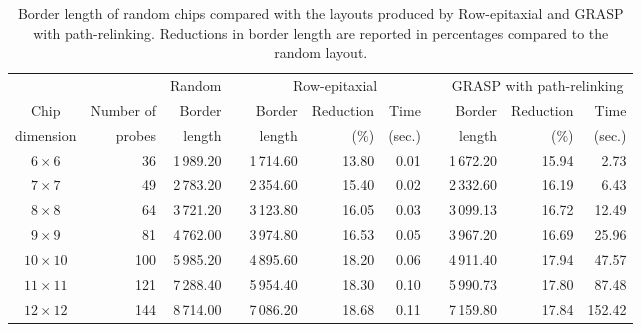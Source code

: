 \documentclass[english]{lni}
\newcommand{\ignore}[1]{}
\begin{document}
\ignore{
The main routine takes
three arguments: matrices $F$ and $D$ and the dimension of the problem~$n$ (in
our case, the number of spots or probes). We generated the matrices using the
formulations presented in Section \ref{sec:qap}.
}

\begin{table}[t]
\caption{Border length of random chips compared with the layouts produced by
Row-epitaxial and GRASP with path-relinking. Reductions in border length are
reported in percentages compared to the random layout.\label{tab:graspr_reptx}}
\vspace*{2ex}
\scriptsize{
\begin{tabular}{crrcrrrcrrr}
          &            & Random & & \multicolumn{3}{c}{Row-epitaxial}  & & \multicolumn{3}{c}{GRASP with path-relinking}  \\ \cline{3-3} \cline{5-7} \cline{9-11}
Chip      & Number of  & Border & & Border & Reduction & Time          & & Border & Reduction & Time   \\
dimension & probes     & length & & length & (\%)      & (sec.)        & & length & (\%)      & (sec.) \\
\hline
$6\times 6$   &  36 & 1\,989.20 & & 1\,714.60 & 13.80 & 0.01 & & 1\,672.20 & 15.94 &   2.73 \\
$7\times 7$   &  49 & 2\,783.20 & & 2\,354.60 & 15.40 & 0.02 & & 2\,332.60 & 16.19 &   6.43 \\
$8\times 8$   &  64 & 3\,721.20 & & 3\,123.80 & 16.05 & 0.03 & & 3\,099.13 & 16.72 &  12.49 \\
$9\times 9$   &  81 & 4\,762.00 & & 3\,974.80 & 16.53 & 0.05 & & 3\,967.20 & 16.69 &  25.96 \\
$10\times 10$ & 100 & 5\,985.20 & & 4\,895.60 & 18.20 & 0.06 & & 4\,911.40 & 17.94 &  47.57 \\
$11\times 11$ & 121 & 7\,288.40 & & 5\,954.40 & 18.30 & 0.10 & & 5\,990.73 & 17.80 &  87.48 \\
$12\times 12$ & 144 & 8\,714.00 & & 7\,086.20 & 18.68 & 0.11 & & 7\,159.80 & 17.84 & 152.42 \\
\hline
\end{tabular}}
\end{table}
\end{document}
